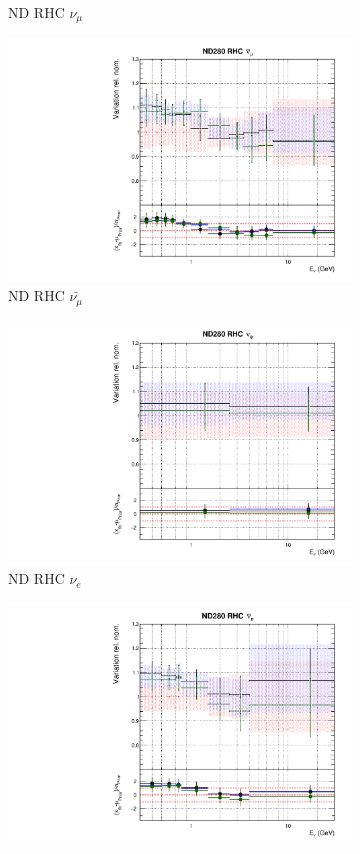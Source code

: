 \begin{figure}
\begin{subfigure}{0.24\textwidth}
  \caption{ND RHC $\nu_{\mu}$}
\end{subfigure}
\begin{subfigure}{0.24\textwidth}
  \centering
  \includegraphics[width=0.95\linewidth]{figs/newolddatafitsflux_5}
  \caption{ND RHC $\bar{\nu_{\mu}}$}
\end{subfigure}
\begin{subfigure}{0.24\textwidth}
  \centering
  \includegraphics[width=0.95\linewidth]{figs/newolddatafitsflux_6}
  \caption{ND RHC $\nu_{e}$}
\end{subfigure}
\vspace{15mm}
\begin{subfigure}{0.24\textwidth}
  \centering
  \includegraphics[width=0.95\linewidth]{figs/newolddatafitsflux_7}

\end{subfigure}
\end{figure}
